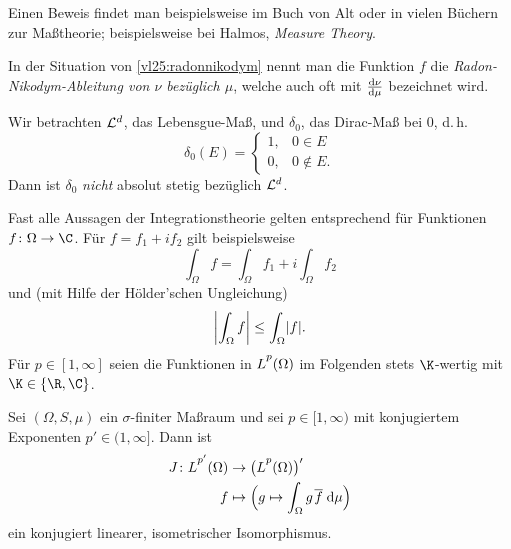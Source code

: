 Einen Beweis findet man beispielsweise im Buch von Alt oder 
in vielen Büchern zur Maßtheorie; beispielsweise bei
Halmos, \emph{Measure Theory}.

\nnBemerkung 
In der Situation von \cref{vl25:radonnikodym} nennt man die Funktion $f$ die
\emph{Radon-Nikodym-Ableitung von $\nu$ bezüglich $\mu$}, welche auch oft mit
$\frac{\mathrm d\nu}{\mathrm d\mu}$ bezeichnet wird.

\nnBeispiel Wir betrachten $\mathcal{L}^d$, das Lebensgue-Maß, und $\delta_0$, das
Dirac-Maß bei $0$, d.\,h.  \[ \delta_0(E) = \begin{cases}
1, & 0\in E \\ 0, & 0\notin E . \end{cases} \]
Dann ist $\delta_0$ \emph{nicht} absolut stetig bezüglich
$\mathcal{L}^d$.

\nnBemerkung Fast alle Aussagen der Integrationstheorie gelten entsprechend für
Funktionen $f\colon\Omega\to\C$. Für $f = f_1 + if_2$ gilt beispielsweise
\[ \int_\Omega f = \int_\Omega f_1 + i \int_\Omega f_2 \]
und (mit Hilfe der Hölder'schen Ungleichung)
\[ \abs*{\int_\Omega f} \leq \int_\Omega \abs{f}  . \]
Für $p\in[1,\infty]$ seien die Funktionen in $\Lpp(\Omega)$
im Folgenden stets $\K$-wertig mit $\K\in\{\R,\C\}$.

\begin{thSatz}%
    \label{vl25:dualraumLp}%
    Sei $(\Omega,S,\mu)$ ein $\sigma$-finiter Maßraum und sei $p\in[1,\infty)$
    mit konjugiertem Exponenten $p'\in(1,\infty]$. Dann ist
    \begin{align*}
        J\colon \Lpp[p'](\Omega) &\to \bigl( \Lpp(\Omega) \bigr)'
        \\
        f &\mapsto \Bigl( 
                g \mapsto \int_\Omega g\mkern2mu\ol{f} \dif\mu
            \Bigr)
    \end{align*}
    ein konjugiert linearer, isometrischer Isomorphismus.
\end{thSatz}

